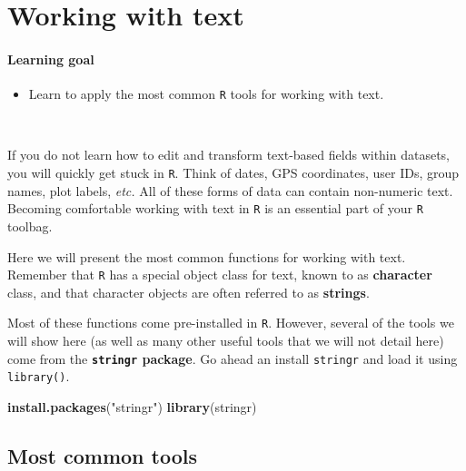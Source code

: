 \documentclass[]{book}
\newenvironment{Shaded}{\begin{snugshade}}{\end{snugshade}}
\newcommand{\KeywordTok}[1]{\textcolor[rgb]{0.13,0.29,0.53}{\textbf{#1}}}
\newcommand{\NormalTok}[1]{#1}
\newcommand{\StringTok}[1]{\textcolor[rgb]{0.31,0.60,0.02}{#1}}
\providecommand{\tightlist}{%
  \setlength{\itemsep}{0pt}\setlength{\parskip}{0pt}}
\begin{document}
\hypertarget{text}{%
\chapter{Working with text}\label{text}}

\hypertarget{learning-goal-1}{%
\subsubsection*{Learning goal}\label{learning-goal-1}}

\begin{itemize}
\tightlist
\item
  Learn to apply the most common \texttt{R} tools for working with text.
\end{itemize}

~

If you do not learn how to edit and transform text-based fields within datasets, you will quickly get stuck in \texttt{R}. Think of dates, GPS coordinates, user IDs, group names, plot labels, \emph{etc.} All of these forms of data can contain non-numeric text. Becoming comfortable working with text in \texttt{R} is an essential part of your \texttt{R} toolbag.

Here we will present the most common functions for working with text. Remember that \texttt{R} has a special object class for text, known to as \textbf{character} class, and that character objects are often referred to as \textbf{strings}.

Most of these functions come pre-installed in \texttt{R}. However, several of the tools we will show here (as well as many other useful tools that we will not detail here) come from the \textbf{\texttt{stringr} package}. Go ahead an install \texttt{stringr} and load it using \texttt{library()}.

\begin{Shaded}
\begin{Highlighting}[]
\KeywordTok{install.packages}\NormalTok{(}\StringTok{"stringr"}\NormalTok{)}
\KeywordTok{library}\NormalTok{(stringr)}
\end{Highlighting}
\end{Shaded}

\hypertarget{most-common-tools}{%
\section*{Most common tools}\label{most-common-tools}}
\end{document}
